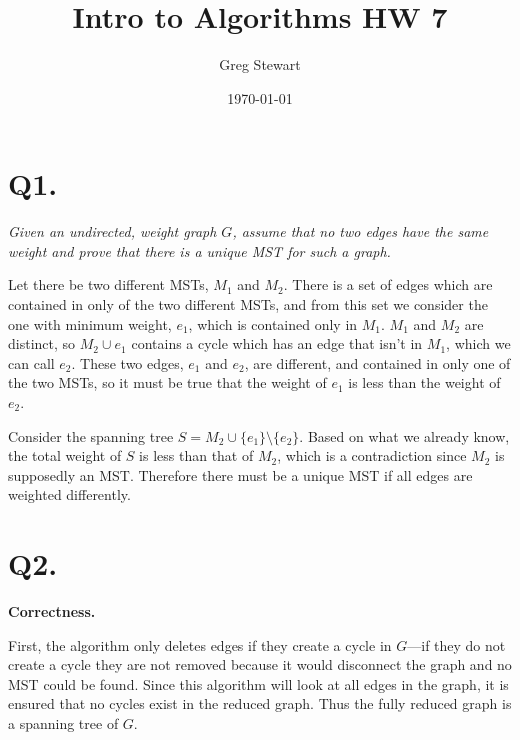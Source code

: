 \documentclass{article}
\title{Intro to Algorithms HW 7}
\author{Greg Stewart}
\date{\today}
\begin{document}
\maketitle

\section*{Q1. }

\textit{Given an undirected, weight graph $G$, assume that no two edges have the same weight and prove that there is a unique MST for such a graph.}

Let there be two different MSTs, $M_1$ and $M_2$. There is a set of edges which are contained in only of the two different MSTs, and from this set we consider the one with minimum weight, $e_1$, which is contained only in $M_1$. $M_1$ and $M_2$ are distinct, so $M_2 \cup e_1$ contains a cycle which has an edge that isn't in $M_1$, which we can call $e_2$. These two edges, $e_1$ and $e_2$, are different, and contained in only one of the two MSTs, so it must be true that the weight of $e_1$ is less than the weight of $e_2$. 

Consider the spanning tree $S = M_2 \cup \{e_1\} \setminus \{e_2\}$. Based on what we already know, the total weight of $S$ is less than that of $M_2$, which is a contradiction since $M_2$ is supposedly an MST. Therefore there must be a unique MST if all edges are weighted differently.







\section*{Q2. }

\textbf{Correctness.}

First, the algorithm only deletes edges if they create a cycle in $G$---if they do not create a cycle they are not removed because it would disconnect the graph and no MST could be found. Since this algorithm will look at all edges in the graph, it is ensured that no cycles exist in the reduced graph. Thus the fully reduced graph is a spanning tree of $G$.
\end{document}
